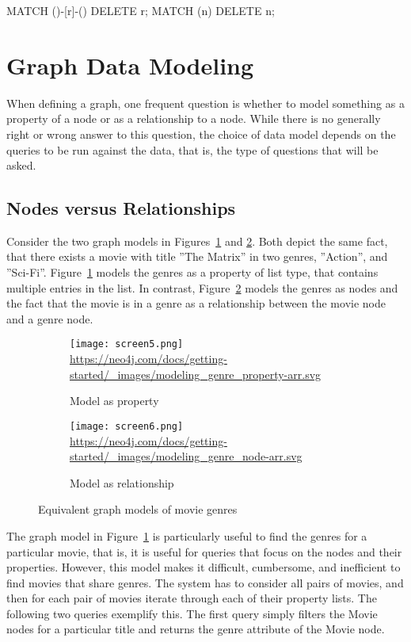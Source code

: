 \begin{cyphercode}
MATCH ()-[r]-() DELETE r;
MATCH (n) DELETE n;
\end{cyphercode}

\section{Graph Data Modeling}

When defining a graph, one frequent question is whether to model something as a property of a node or as a relationship to a node. While there is no generally right or wrong answer to this question, the choice of data model depends on the queries to be run against the data, that is, the type of questions that will be asked.

\subsection*{Nodes versus Relationships}

Consider the two graph models in Figures~\ref{fig:propertymodel} and \ref{fig:relationshipmodel}. Both depict the same fact, that there exists a movie with title ''The Matrix'' in two genres, ''Action'', and ''Sci-Fi''. Figure~\ref{fig:propertymodel} models the genres as a property of list type, that contains multiple entries in the list. In contrast, Figure~\ref{fig:relationshipmodel} models the genres as nodes and the fact that the movie is in a genre as a relationship between the movie node and a genre node.

\begin{figure}
\centering
\begin{subfigure}{0.48\textwidth}
    \texttt{[image: screen5.png]}
    \scriptsize{\url{https://neo4j.com/docs/getting-started/\_images/modeling\_genre\_property-arr.svg}}
    \caption{Model as property}
    \label{fig:propertymodel}
\end{subfigure}
\hfill
\begin{subfigure}{0.48\textwidth}
    \texttt{[image: screen6.png]}
    \scriptsize{\url{https://neo4j.com/docs/getting-started/\_images/modeling\_genre\_node-arr.svg}}
    \caption{Model as relationship}
    \label{fig:relationshipmodel}
\end{subfigure}
\hfill
\caption{Equivalent graph models of movie genres}
\label{fig:equivalentmodels}
\end{figure}

The graph model in Figure~\ref{fig:propertymodel} is particularly useful to find the genres for a particular movie, that is, it is useful for queries that focus on the nodes and their properties. However, this model makes it difficult, cumbersome, and inefficient to find movies that share genres. The system has to consider all pairs of movies, and then for each pair of movies iterate through each of their property lists. The following two queries exemplify this. The first query simply filters the Movie nodes for a particular title and returns the genre attribute of the Movie node. 

